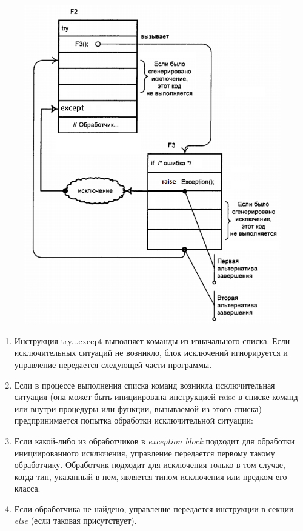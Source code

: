 \documentclass[xcolor=table]{beamer}
\begin{document}
\begin{frame}
	\begin{figure}[h]
		\centering
		\includegraphics[scale=0.5]{images/lec08-pic07.png}
	\end{figure}
\end{frame}

\begin{frame}
	\begin{enumerate}
		\item Инструкция try...except выполняет команды из изначального списка. Если исключительных ситуаций не возникло, блок исключений игнорируется и управление передается следующей части программы.
		\item Если в процессе выполнения списка команд возникла исключительная ситуация (она может быть инициирована инструкцией raise в списке команд или внутри процедуры или функции, вызываемой из этого списка) предпринимается попытка обработки исключительной ситуации:
		\item Если какой-либо из обработчиков в \textit{exception block} подходит для обработки инициированного исключения, управление передается первому такому обработчику. Обработчик подходит для исключения только в том случае, когда тип, указанный в нем, является типом исключения или предком его класса.
		\item Если обработчика не найдено, управление передается инструкции в секции \textit{else} (если таковая присутствует).
	\end{enumerate}
\end{frame}
\end{document}
